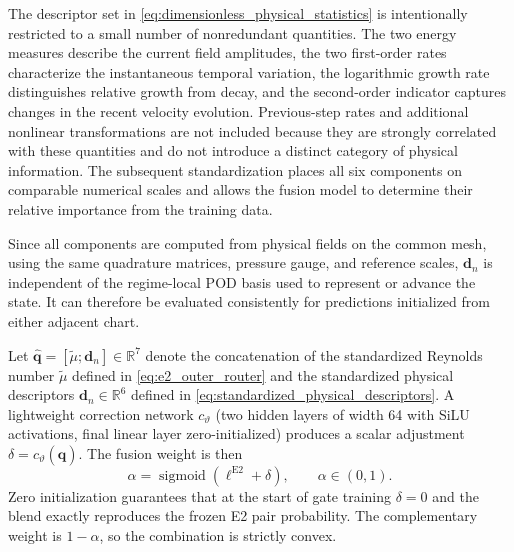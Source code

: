 The descriptor set in
\eqref{eq:dimensionless_physical_statistics} is intentionally restricted to
a small number of nonredundant quantities.  The two energy measures describe
the current field amplitudes, the two first-order rates characterize the
instantaneous temporal variation, the logarithmic growth rate distinguishes
relative growth from decay, and the second-order indicator captures changes
in the recent velocity evolution.  Previous-step rates and additional
nonlinear transformations are not included because they are strongly
correlated with these quantities and do not introduce a distinct category of
physical information.  The subsequent standardization places all six
components on comparable numerical scales and allows the fusion model to
determine their relative importance from the training data.

Since all components are computed from physical fields on the common mesh,
using the same quadrature matrices, pressure gauge, and reference scales,
$\boldsymbol{d}_n$ is independent of the regime-local POD basis used to
represent or advance the state.  It can therefore be evaluated consistently
for predictions initialized from either adjacent chart.



Let $\widehat{\boldsymbol{q}} = [\widetilde{\mu}; \boldsymbol{d}_n] \in \mathbb{R}^{7}$ 
denote the concatenation of the standardized Reynolds number 
$\widetilde{\mu}$ defined in \eqref{eq:e2_outer_router} and the 
standardized physical descriptors $\boldsymbol{d}_n \in \mathbb{R}^{6}$ 
defined in \eqref{eq:standardized_physical_descriptors}.
A lightweight correction network
$c_{\vartheta}$ (two hidden layers of width 64 with SiLU activations,
final linear layer zero-initialized) produces a scalar adjustment
$\delta = c_{\vartheta}(\widehat{\boldsymbol{q}})$.  The fusion weight is
then
\begin{equation}
  \alpha
  =
  \operatorname{sigmoid}
  \left(
  \ell^{\mathrm{E2}} + \delta
  \right),
  \qquad
  \alpha\in(0,1).
  \label{eq:t2c_convex_gate}
\end{equation}
Zero initialization guarantees that at the start of gate training
$\delta=0$ and the blend exactly reproduces the frozen E2 pair probability.
The complementary weight is $1-\alpha$, so the combination is strictly
convex.

